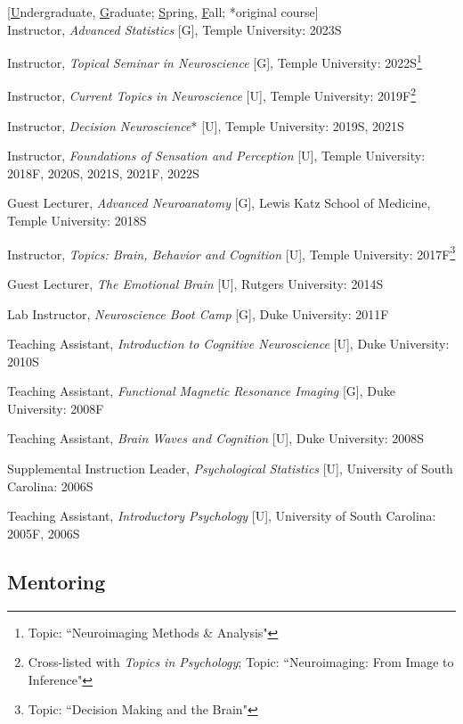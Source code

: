 \documentclass[11pt, letterpaper]{article}
\begin{document}
\begin{hangparas}{.5in}{1}

[\underline{U}ndergraduate, \underline{G}raduate; \underline{S}pring, \underline{F}all; *original course]  \\

Instructor, \textit{Advanced Statistics} [G], Temple University: 2023S

Instructor, \textit{Topical Seminar in Neuroscience} [G], Temple University: 2022S\footnote{Topic: ``Neuroimaging Methods \& Analysis"}

Instructor, \textit{Current Topics in Neuroscience} [U], Temple University: 2019F\footnote{Cross-listed with \textit{Topics in Psychology}; Topic: ``Neuroimaging: From Image to Inference"}

Instructor, \textit{Decision Neuroscience}* [U], Temple University: 2019S, 2021S

Instructor, \textit{Foundations of Sensation and Perception} [U], Temple University: 2018F, 2020S, 2021S, 2021F, 2022S

Guest Lecturer, \textit{Advanced Neuroanatomy} [G], Lewis Katz School of Medicine, Temple University: 2018S

Instructor, \textit{Topics: Brain, Behavior and Cognition} [U], Temple University: 2017F\footnote{Topic: ``Decision Making and the Brain"}

Guest Lecturer, \textit{The Emotional Brain} [U], Rutgers University: 2014S

Lab Instructor, \textit{Neuroscience Boot Camp} [G], Duke University: 2011F

Teaching Assistant, \textit{Introduction to Cognitive Neuroscience} [U], Duke University: 2010S

Teaching Assistant, \textit{Functional Magnetic Resonance Imaging} [G], Duke University: 2008F

Teaching Assistant, \textit{Brain Waves and Cognition} [U], Duke University: 2008S

Supplemental Instruction Leader, \textit{Psychological Statistics} [U], University of South Carolina: 2006S

Teaching Assistant, \textit{Introductory Psychology} [U], University of South Carolina: 2005F, 2006S \\

\end{hangparas}


\subsection*{Mentoring}
\end{document}
